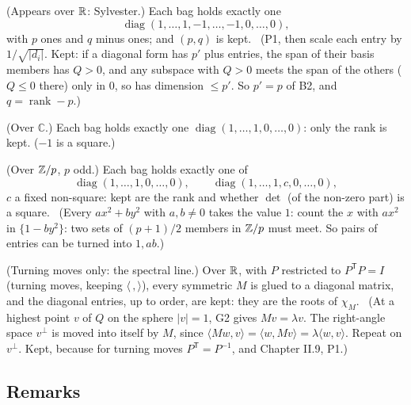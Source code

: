 \begin{lines}
\item[\lab{T1}] (Appears over $\mathbb{R}$: Sylvester.) Each bag holds exactly one \[ \operatorname{diag}(1, \dots, 1, -1, \dots, -1, 0, \dots, 0), \] with $p$ ones and $q$ minus ones; and $(p, q)$ is kept. \ (P1, then scale each entry by $1/\sqrt{|d_i|}$. Kept: if a diagonal form has $p'$ plus entries, the span of their basis members has $Q > 0$, and any subspace with $Q > 0$ meets the span of the others ($Q \le 0$ there) only in $0$, so has dimension $\le p'$. So $p' = p$ of B2, and $q = \operatorname{rank} - p$.)
\item[\lab{T2}] (Over $\mathbb{C}$.) Each bag holds exactly one $\operatorname{diag}(1, \dots, 1, 0, \dots, 0)$: only the rank is kept. ($-1$ is a square.)
\item[\lab{T3}] (Over $\mathbb{Z}/p$, $p$ odd.) Each bag holds exactly one of \[ \operatorname{diag}(1, \dots, 1, 0, \dots, 0), \qquad \operatorname{diag}(1, \dots, 1, c, 0, \dots, 0), \] $c$ a fixed non-square: kept are the rank and whether $\det$ (of the non-zero part) is a square. \ (Every $a x^2 + b y^2$ with $a, b \ne 0$ takes the value $1$: count the $x$ with $ax^2$ in $\{1 - by^2\}$: two sets of $(p + 1)/2$ members in $\mathbb{Z}/p$ must meet. So pairs of entries can be turned into $1, ab$.)
\item[\lab{T4}] (Turning moves only: the spectral line.) Over $\mathbb{R}$, with $P$ restricted to $P^{\mathsf T} P = I$ (turning moves, keeping $\langle\,,\rangle$), every symmetric $M$ is glued to a diagonal matrix, and the diagonal entries, up to order, are kept: they are the roots of $\chi_M$. \ (At a highest point $v$ of $Q$ on the sphere $|v| = 1$, G2 gives $Mv = \lambda v$. The right-angle space $v^\perp$ is moved into itself by $M$, since $\langle Mw, v\rangle = \langle w, Mv\rangle = \lambda \langle w, v\rangle$. Repeat on $v^\perp$. Kept, because for turning moves $P^{\mathsf T} = P^{-1}$, and Chapter II.9, P1.)
\end{lines}

\subsection*{Remarks}

